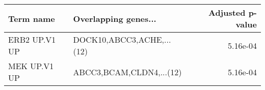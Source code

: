 \begin{tabular}{llr}
\toprule
    Term name &      Overlapping genes... &  Adjusted p-value \\
\midrule
ERB2 UP.V1 UP & DOCK10,ABCC3,ACHE,...(12) &          5.16e-04 \\
 MEK UP.V1 UP &  ABCC3,BCAM,CLDN4,...(12) &          5.16e-04 \\
\bottomrule
\end{tabular}
